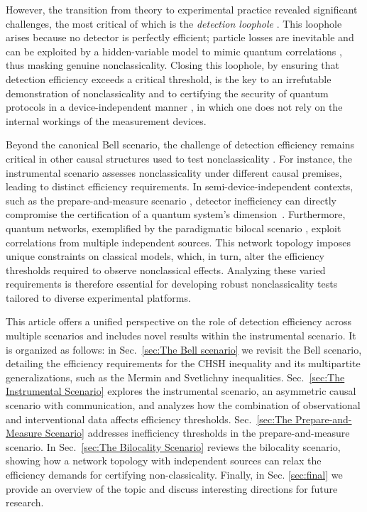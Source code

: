 \documentclass[aps,pra,reprint, superscriptaddress,showkeys]{revtex4-2}
\theoremstyle{plain}
\begin{document}
However, the transition from theory to experimental practice revealed significant challenges, the most critical of which is the \emph{detection loophole} \cite{Pearle}. This loophole arises because no detector is perfectly efficient; particle losses are inevitable and can be exploited by a hidden-variable model to mimic quantum correlations \cite{Branciard2011,Eberhard93}, thus masking genuine nonclassicality. Closing this loophole, by ensuring that detection efficiency exceeds a critical threshold, is the key to an irrefutable demonstration of nonclassicality and to certifying the security of quantum protocols in a device-independent manner \cite{Ekert91}, in which one does not rely on the internal workings of the measurement devices.

Beyond the canonical Bell scenario, the challenge of detection efficiency remains critical in other causal structures used to test nonclassicality \cite{Pearl2009causality}. For instance, the instrumental scenario \cite{pearl2013,chaves2018quantum,van2019quantum,GMR_QCI} assesses nonclassicality under different causal premises, leading to distinct efficiency requirements. In semi-device-independent contexts, such as the prepare-and-measure scenario \cite{gallego2010}, detector inefficiency can directly compromise the certification of a quantum system’s dimension~\cite{DallArno2015,Mironowicz2021}. Furthermore, quantum networks, exemplified by the paradigmatic bilocal scenario \cite{branciardbilocal,branciardcharacterizing,tavakoli2021bilocal}, exploit correlations from multiple independent sources. This network topology imposes unique constraints on classical models, which, in turn, alter the efficiency thresholds required to observe nonclassical effects. Analyzing these varied requirements is therefore essential for developing robust nonclassicality tests tailored to diverse experimental platforms.

This article offers a unified perspective on the role of detection efficiency across multiple scenarios and includes novel results within the instrumental scenario. It is organized as follows: in Sec.~\ref{sec:The Bell scenario} we revisit the Bell scenario, detailing the efficiency requirements for the CHSH inequality and its multipartite generalizations, such as the Mermin and Svetlichny inequalities. Sec.~\ref{sec:The Instrumental Scenario} explores the instrumental scenario, an asymmetric causal scenario with communication, and analyzes how the combination of observational and interventional data affects efficiency thresholds. Sec.~\ref{sec:The Prepare-and-Measure Scenario} addresses inefficiency thresholds in the prepare-and-measure scenario. In Sec.~\ref{sec:The Bilocality Scenario} reviews the bilocality scenario, showing how a network topology with independent sources can relax the efficiency demands for certifying non-classicality. Finally, in Sec. \ref{sec:final} we provide an overview of the topic and discuss interesting directions for future research.
\end{document}
